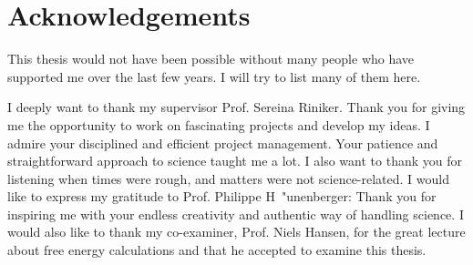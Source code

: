 \chapter{Acknowledgements}
This thesis would not have been possible without many people who have
supported me over the last few years. I will try to list many of them here.

I deeply want to thank my supervisor Prof. Sereina Riniker. Thank you for giving me the opportunity to work on fascinating projects and develop my ideas. I admire your disciplined and efficient project management. Your patience and straightforward approach to science taught me a lot. I also want to thank you for listening when times were rough, and matters were not science-related.
I would like to express my gratitude to Prof. Philippe H{\ "u}nenberger: Thank you for inspiring me with your endless creativity and authentic way of handling science.
I would also like to thank my co-examiner, Prof. Niels Hansen, for the great lecture about free energy calculations and that he accepted to examine this thesis.


